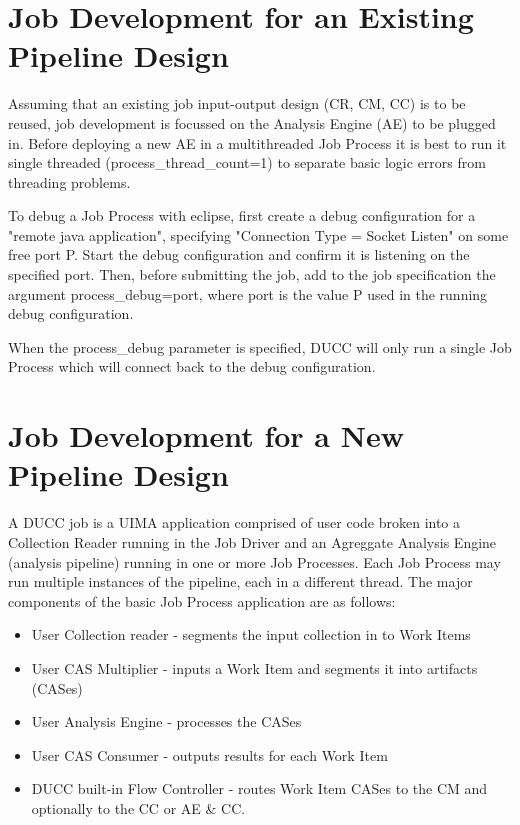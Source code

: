 \section{Job Development for an Existing Pipeline Design}

Assuming that an existing job input-output design (CR, CM, CC) is to be reused, job
development is focussed on the Analysis Engine (AE) to be plugged in. Before deploying a new
AE in a multithreaded Job Process it is best to run it single threaded
(process\_thread\_count=1) to separate basic logic errors from threading
problems.

To debug a Job Process with eclipse, first create a debug configuration for a
"remote java application", specifying "Connection Type = Socket Listen" on some
free port P. Start the debug configuration and confirm it is listening on the specified port.
Then, before submitting the job, add to the job specification the argument
process\_debug=port, where port is the value P used in the running debug configuration.

When the process\_debug parameter is specified, DUCC will only run a single Job Process
which will connect back to the debug configuration.


\section{Job Development for a New Pipeline Design}

A DUCC job is a UIMA application comprised of user code broken into a Collection
Reader running in the Job Driver and an Agreggate Analysis Engine (analysis pipeline) running in one 
or more Job Processes. Each Job Process may run multiple instances of the pipeline, each in a different
thread. The major components of the basic Job Process application are as follows:

\begin{itemize}
  \item User Collection reader - segments the input collection in to Work Items
  \item User CAS Multiplier - inputs a Work Item and segments it into artifacts (CASes)
  \item User Analysis Engine - processes the CASes
  \item User CAS Consumer - outputs results for each Work Item
  \item DUCC built-in Flow Controller - routes Work Item CASes to the CM and optionally to the CC or AE \& CC.
\end{itemize}

